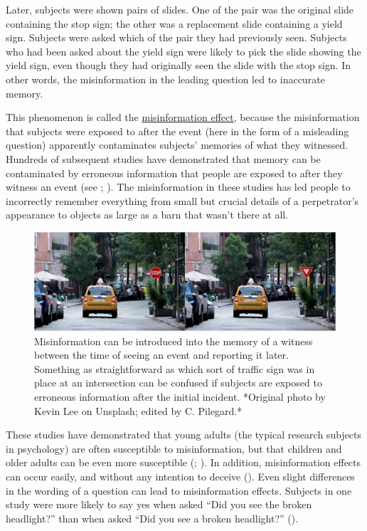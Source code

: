 \documentclass[
]{krantz}
\begin{document}
Later, subjects were shown pairs of slides. One of the pair was the original slide containing the stop sign; the other was a replacement slide containing a yield sign. Subjects were asked which of the pair they had previously seen. Subjects who had been asked about the yield sign were likely to pick the slide showing the yield sign, even though they had originally seen the slide with the stop sign. In other words, the misinformation in the leading question led to inaccurate memory.

This phenomenon is called the \hyperref[misinformation-effect]{misinformation effect}, because the misinformation that subjects were exposed to after the event (here in the form of a misleading question) apparently contaminates subjects' memories of what they witnessed. Hundreds of subsequent studies have demonstrated that memory can be contaminated by erroneous information that people are exposed to after they witness an event (see ; ). The misinformation in these studies has led people to incorrectly remember everything from small but crucial details of a perpetrator's appearance to objects as large as a barn that wasn't there at all.

\begin{figure}

{\centering \includegraphics[width=0.8\linewidth]{images/ch6/fig2} 

}

\caption{Misinformation can be introduced into the memory of a witness between the time of seeing an event and reporting it later. Something as straightforward as which sort of traffic sign was in place at an intersection can be confused if subjects are exposed to erroneous information after the initial incident. *Original photo by Kevin Lee on Unsplash; edited by C. Pilegard.*}\label{fig:trafficsign}
\end{figure}

These studies have demonstrated that young adults (the typical research subjects in psychology) are often susceptible to misinformation, but that children and older adults can be even more susceptible (; ). In addition, misinformation effects can occur easily, and without any intention to deceive (). Even slight differences in the wording of a question can lead to misinformation effects. Subjects in one study were more likely to say yes when asked ``Did you see the broken headlight?'' than when asked ``Did you see a broken headlight?'' ().
\end{document}
